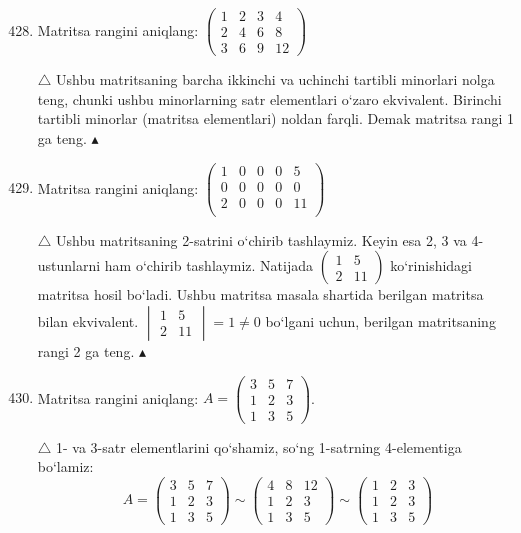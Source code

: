 \begin{enumerate}
	\setcounter{enumi}{427}
	
	\item Matritsa rangini aniqlang: $\begin{pmatrix}
		1&2&3&4\\2&4&6&8\\3&6&9&12
	\end{pmatrix}$
	
	$\triangle$ Ushbu matritsaning barcha ikkinchi va uchinchi tartibli minorlari nolga teng, chunki ushbu minorlarning satr elementlari o`zaro ekvivalent. Birinchi tartibli minorlar (matritsa elementlari) noldan farqli. Demak matritsa rangi 1 ga teng. $\blacktriangle$
	
	\item Matritsa rangini aniqlang: $\begin{pmatrix}
		1&0&0&0&5\\0&0&0&0&0\\2&0&0&0&11\\
	\end{pmatrix}$

$\triangle$ Ushbu matritsaning 2-satrini o`chirib tashlaymiz. Keyin esa 2, 3 va 4-ustunlarni ham o`chirib tashlaymiz. Natijada $\begin{pmatrix} 1&5\\2&11\end{pmatrix}$ ko`rinishidagi matritsa hosil bo`ladi. Ushbu matritsa masala shartida berilgan matritsa bilan ekvivalent. $\begin{vmatrix}
	1&5\\2&11
\end{vmatrix}=1\ne0$ bo`lgani uchun, berilgan matritsaning rangi 2 ga teng. $\blacktriangle$

\item Matritsa rangini aniqlang: $A=\begin{pmatrix}
	3&5&7\\1&2&3\\1&3&5
\end{pmatrix}$.

$\triangle$ 1- va 3-satr elementlarini qo`shamiz, so`ng 1-satrning 4-elementiga bo`lamiz:
$$A=\begin{pmatrix}
	3&5&7\\1&2&3\\1&3&5
\end{pmatrix}\sim\begin{pmatrix}
4&8&12\\1&2&3\\1&3&5
\end{pmatrix}\sim\begin{pmatrix}
1&2&3\\1&2&3\\1&3&5
\end{pmatrix}
$$


\end{enumerate}
